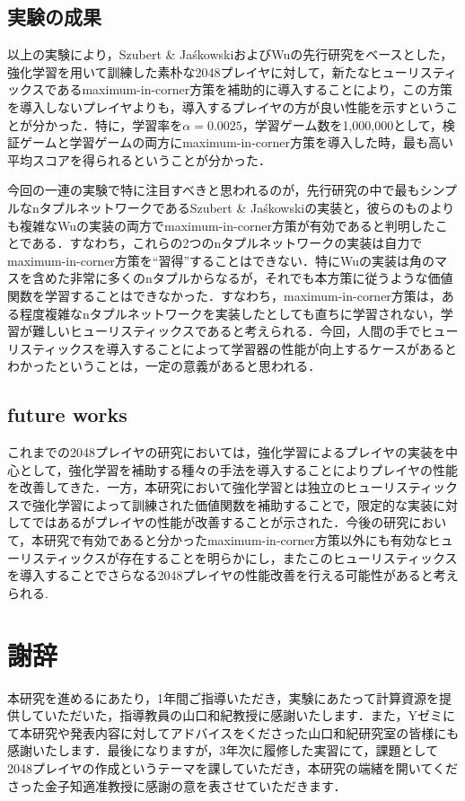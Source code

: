 \documentclass{suribt}
\begin{document}
\section{実験の成果}
以上の実験により，Szubert \&  Ja\'{s}kowskiおよびWuの先行研究をベースとした，強化学習を用いて訓練した素朴な2048プレイヤに対して，新たなヒューリスティックスであるmaximum-in-corner方策を補助的に導入することにより，この方策を導入しないプレイヤよりも，導入するプレイヤの方が良い性能を示すということが分かった．特に，学習率を${\alpha}=0.0025$，学習ゲーム数を1,000,000として，検証ゲームと学習ゲームの両方にmaximum-in-corner方策を導入した時，最も高い平均スコアを得られるということが分かった．

今回の一連の実験で特に注目すべきと思われるのが，先行研究の中で最もシンプルなnタプルネットワークであるSzubert \&  Ja\'{s}kowskiの実装と，彼らのものよりも複雑なWuの実装の両方でmaximum-in-corner方策が有効であると判明したことである．すなわち，これらの2つのnタプルネットワークの実装は自力でmaximum-in-corner方策を“習得”することはできない．特にWuの実装は角のマスを含めた非常に多くのnタプルからなるが，それでも本方策に従うような価値関数を学習することはできなかった．すなわち，maximum-in-corner方策は，ある程度複雑なnタプルネットワークを実装したとしても直ちに学習されない，学習が難しいヒューリスティックスであると考えられる．今回，人間の手でヒューリスティックスを導入することによって学習器の性能が向上するケースがあるとわかったということは，一定の意義があると思われる．

\section{future works}
これまでの2048プレイヤの研究においては，強化学習によるプレイヤの実装を中心として，強化学習を補助する種々の手法を導入することによりプレイヤの性能を改善してきた．一方，本研究において強化学習とは独立のヒューリスティックスで強化学習によって訓練された価値関数を補助することで，限定的な実装に対してではあるがプレイヤの性能が改善することが示された．今後の研究において，本研究で有効であると分かったmaximum-in-corner方策以外にも有効なヒューリスティックスが存在することを明らかにし，またこのヒューリスティックスを導入することでさらなる2048プレイヤの性能改善を行える可能性があると考えられる.

\backmatter
\chapter{謝辞}
本研究を進めるにあたり，1年間ご指導いただき，実験にあたって計算資源を提供していただいた，指導教員の山口和紀教授に感謝いたします．また，Yゼミにて本研究や発表内容に対してアドバイスをくださった山口和紀研究室の皆様にも感謝いたします．最後になりますが，3年次に履修した実習にて，課題として2048プレイヤの作成というテーマを課していただき，本研究の端緒を開いてくださった金子知適准教授に感謝の意を表させていただきます．
\end{document}
